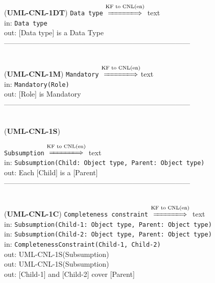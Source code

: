 \documentclass[sn-mathphys]{sn-jnl}
\begin{document}
{{{{{({\bf UML-CNL-1DT}) {\tt Data type} $\overset{\text{KF to CNL(en)}}{\xLongrightarrow{\hspace*{1.4cm}}}$ text\\
\hspace*{0.3cm}in: {\tt Data type}\\
\hspace*{0.5cm}out: [Data type] is a Data Type\\

------------------------------------------------------------------------------
\\ \

({\bf UML-CNL-1M}) {\tt Mandatory} $\overset{\text{KF to CNL(en)}}{\xLongrightarrow{\hspace*{1.4cm}}}${text}\\
\hspace*{0.3cm}in: {\tt Mandatory(Role)}\\
\hspace*{0.5cm}out: [Role] is Mandatory\\

------------------------------------------------------------------------------
\\ \

({\bf UML-CNL-1S}) {{\tt Subsumption} $\overset{\text{KF to CNL(en)}}{\xLongrightarrow{\hspace*{1.4cm}}}$ {text}\\
\hspace*{0.3cm}in: {\tt Subsumption(Child: Object type, Parent: Object type)} \\
\hspace*{0.5cm}out:  Each [Child] is a [Parent]\\
 
------------------------------------------------------------------------------
\\ \


({\bf UML-CNL-1C}) {\tt Completeness constraint} $\overset{\text{KF to CNL(en)}}{\xLongrightarrow{\hspace*{1.4cm}}}$ {text}\\
\hspace*{0.3cm}in: {\tt Subsumption(Child-1: Object type, Parent: Object type)} \\
\hspace*{0.3cm}in: {\tt Subsumption(Child-2: Object type, Parent: Object type)} \\
\hspace*{0.3cm}in: {\tt CompletenessConstraint(Child-1, Child-2)} \\
\hspace*{0.5cm}out:  {UML-CNL-1S(Subsumption)}\\
\hspace*{0.5cm}out:  {UML-CNL-1S(Subsumption)}\\
\hspace*{0.5cm}out:  [Child-1] and [Child-2] cover [Parent]\\

}}}}}}
\end{document}
